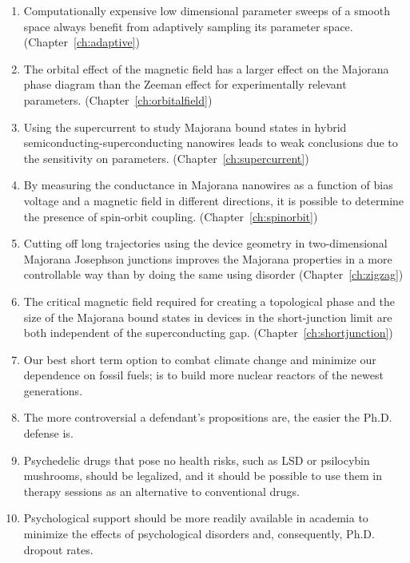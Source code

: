 \documentclass{dissertation}
\begin{document}
\begin{enumerate}

\item Computationally expensive low dimensional parameter sweeps of a smooth space always benefit from adaptively sampling its parameter space. (Chapter~\ref{ch:adaptive})

\item The orbital effect of the magnetic field has a larger effect on the Majorana phase diagram than the Zeeman effect for experimentally relevant parameters. (Chapter~\ref{ch:orbitalfield})

\item Using the supercurrent to study Majorana bound states in hybrid semiconducting-superconducting nanowires leads to weak conclusions due to the sensitivity on parameters. (Chapter~\ref{ch:supercurrent})

\item By measuring the conductance in Majorana nanowires as a function of bias voltage and a magnetic field in different directions, it is possible to determine the presence of spin-orbit coupling. (Chapter~\ref{ch:spinorbit})

\item Cutting off long trajectories using the device geometry in two-dimensional Majorana Josephson junctions improves the Majorana properties in a more controllable way than by doing the same using disorder (Chapter~\ref{ch:zigzag})

\item The critical magnetic field required for creating a topological phase and the size of the Majorana bound states in devices in the short-junction limit are both independent of the superconducting gap. (Chapter~\ref{ch:shortjunction})

\item Our best short term option to combat climate change and minimize our dependence on fossil fuels; is to build more nuclear reactors of the newest generations.

\item The more controversial a defendant's propositions are, the easier the Ph.D. defense is.

\item Psychedelic drugs that pose no health risks, such as LSD or psilocybin mushrooms, should be legalized, and it should be possible to use them in therapy sessions as an alternative to conventional drugs.

\item Psychological support should be more readily available in academia to minimize the effects of psychological disorders and, consequently, Ph.D. dropout rates.


\end{enumerate}
\end{document}

